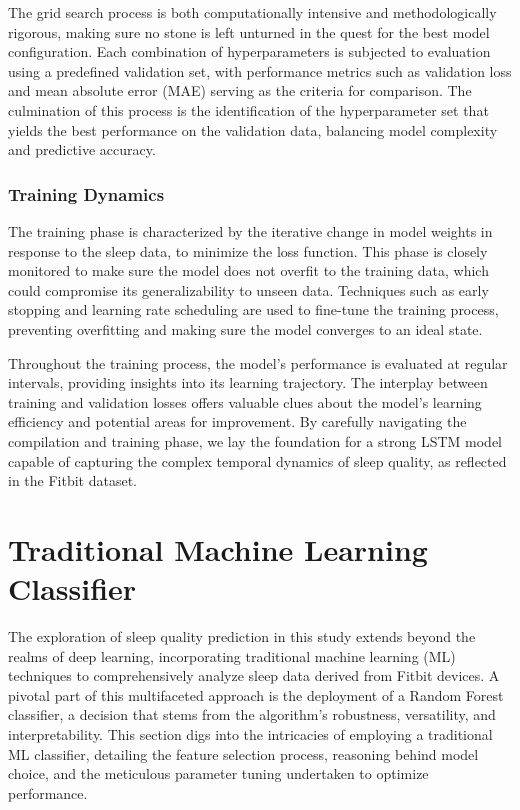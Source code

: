 \documentclass[10pt]{extarticle}
\begin{document}
The grid search process is both computationally intensive and methodologically rigorous, making sure no stone is left unturned in the quest for the best model configuration. Each combination of hyperparameters is subjected to evaluation using a predefined validation set, with performance metrics such as validation loss and mean absolute error (MAE) serving as the criteria for comparison. The culmination of this process is the identification of the hyperparameter set that yields the best performance on the validation data, balancing model complexity and predictive accuracy.

\subsubsection{Training Dynamics}

The training phase is characterized by the iterative change in model weights in response to the sleep data, to minimize the loss function. This phase is closely monitored to make sure the model does not overfit to the training data, which could compromise its generalizability to unseen data. Techniques such as early stopping and learning rate scheduling are used to fine-tune the training process, preventing overfitting and making sure the model converges to an ideal state.

Throughout the training process, the model's performance is evaluated at regular intervals, providing insights into its learning trajectory. The interplay between training and validation losses offers valuable clues about the model's learning efficiency and potential areas for improvement. By carefully navigating the compilation and training phase, we lay the foundation for a strong LSTM model capable of capturing the complex temporal dynamics of sleep quality, as reflected in the Fitbit dataset.

\section{Traditional Machine Learning Classifier}

The exploration of sleep quality prediction in this study extends beyond the realms of deep learning, incorporating traditional machine learning (ML) techniques to comprehensively analyze sleep data derived from Fitbit devices. A pivotal part of this multifaceted approach is the deployment of a Random Forest classifier, a decision that stems from the algorithm's robustness, versatility, and interpretability. This section digs into the intricacies of employing a traditional ML classifier, detailing the feature selection process, reasoning behind model choice, and the meticulous parameter tuning undertaken to optimize performance.
\end{document}

